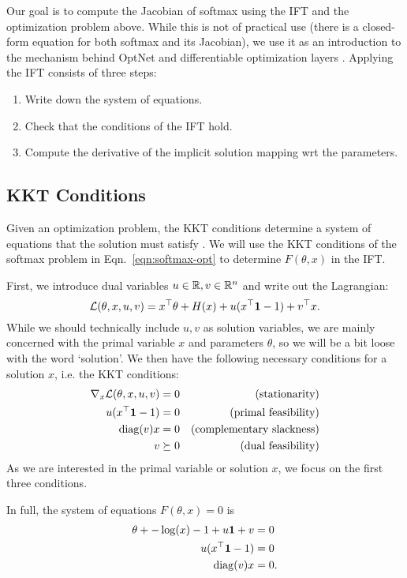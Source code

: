 \documentclass[11pt]{article}
\begin{document}
Our goal is to compute the Jacobian of softmax
using the IFT and the optimization problem above.
While this is not of practical use (there is a closed-form equation
for both softmax and its Jacobian),
we use it as an introduction to the mechanism
behind OptNet and differentiable optimization layers
\citep{optnet,agrawal2019diffcvx}.
Applying the IFT consists of three steps:
\begin{enumerate}
\item Write down the system of equations.
\item Check that the conditions of the IFT hold.
\item Compute the derivative of the implicit solution mapping wrt the parameters.
\end{enumerate}

\subsection{KKT Conditions}
Given an optimization problem, the KKT conditions determine a system of equations
that the solution must satisfy \citep{kkt-thesis,kkt}.
We will use the KKT conditions of the softmax problem in
Eqn.~\ref{eqn:softmax-opt} to determine $F(\theta,x)$ in the IFT.

First, we introduce dual variables $u\in\mathbb{R},v\in\mathbb{R}^n$ and write out the Lagrangian:
$$\mathcal{L}(\theta, x, u, v) = x^\top\theta + H(x) + u(x^\top \mathbf{1} - 1) + v^\top x.$$
While we should technically include $u,v$ as solution variables,
we are mainly concerned with the primal variable $x$ and parameters $\theta$,
so we will be a bit loose with the word `solution'.
We then have the following necessary conditions for a solution $x$,
i.e. the KKT conditions:
\begin{equation}
\begin{aligned}
\nabla_x \mathcal{L}(\theta, x,u,v) = 0 && \textrm{(stationarity)}\\
u(x^{\top} \mathbf{1} - 1) = 0 && \textrm{(primal feasibility)}\\
\mathrm{diag}(v)x = 0 && \textrm{(complementary slackness)}\\
v \succeq 0 && \textrm{(dual feasibility)}
\end{aligned}
\end{equation}
As we are interested in the primal variable or solution $x$,
we focus on the first three conditions.

In full, the system of equations $F(\theta, x) = 0$ is
\begin{equation}
\label{eqn:system}
\begin{aligned}
\theta + -\log(x) - 1 + u\mathbf{1} + v &= 0\\
u(x^{\top} \mathbf{1} - 1) &= 0\\
\mathrm{diag}(v)x &= 0.
\end{aligned}
\end{equation}
\end{document}
